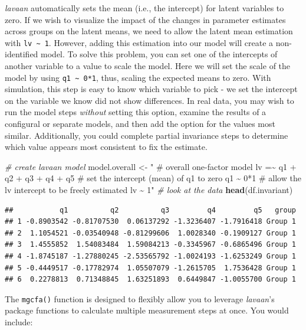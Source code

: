 \documentclass[
  man,floatsintext]{apa7}
\newenvironment{Shaded}{\begin{snugshade}}{\end{snugshade}}
\newcommand{\CommentTok}[1]{\textcolor[rgb]{0.56,0.35,0.01}{\textit{#1}}}
\newcommand{\FunctionTok}[1]{\textcolor[rgb]{0.13,0.29,0.53}{\textbf{#1}}}
\newcommand{\NormalTok}[1]{#1}
\newcommand{\OtherTok}[1]{\textcolor[rgb]{0.56,0.35,0.01}{#1}}
\newcommand{\StringTok}[1]{\textcolor[rgb]{0.31,0.60,0.02}{#1}}
\begin{document}
\emph{lavaan} automatically sets the mean (i.e., the intercept) for latent variables to zero. If we wish to visualize the impact of the changes in parameter estimates across groups on the latent means, we need to allow the latent mean estimation with \texttt{lv\ \textasciitilde{}\ 1}. However, adding this estimation into our model will create a non-identified model. To solve this problem, you can set one of the intercepts of another variable to a value to scale the model. Here we will set the scale of the model by using \texttt{q1\ \textasciitilde{}\ 0*1}, thus, scaling the expected means to zero. With simulation, this step is easy to know which variable to pick - we set the intercept on the variable we know did not show differences. In real data, you may wish to run the model steps \emph{without} setting this option, examine the results of a configural or separate models, and then add the option for the values most similar. Additionally, you could complete partial invariance steps to determine which value appears most consistent to fix the estimate.

\small

\begin{Shaded}
\begin{Highlighting}[]
\CommentTok{\# create lavaan model}
\NormalTok{model.overall }\OtherTok{\textless{}{-}} \StringTok{"}
\StringTok{\# overall one{-}factor model}
\StringTok{lv =\textasciitilde{} q1 + q2 + q3 + q4 + q5}
\StringTok{\# set the intercept (mean) of q1 to zero}
\StringTok{q1 \textasciitilde{} 0*1}
\StringTok{\# allow the lv intercept to be freely estimated}
\StringTok{lv \textasciitilde{} 1"}
\CommentTok{\# look at the data}
\FunctionTok{head}\NormalTok{(df.invariant)}
\end{Highlighting}
\end{Shaded}

\normalsize

\begin{verbatim}
##           q1          q2          q3         q4         q5   group
## 1 -0.8903542 -0.81707530  0.06137292 -1.3236407 -1.7916418 Group 1
## 2  1.1054521 -0.03540948 -0.81299606  1.0028340 -0.1909127 Group 1
## 3  1.4555852  1.54083484  1.59084213 -0.3345967 -0.6865496 Group 1
## 4 -1.8745187 -1.27880245 -2.53565792 -1.0024193 -1.6253249 Group 1
## 5 -0.4449517 -0.17782974  1.05507079 -1.2615705  1.7536428 Group 1
## 6  0.2278813  0.71348845  1.63251893  0.6449847 -1.0055700 Group 1
\end{verbatim}

The \texttt{mgcfa()} function is designed to flexibly allow you to leverage \emph{lavaan}'s package functions to calculate multiple measurement steps at once. You would include:
\end{document}
